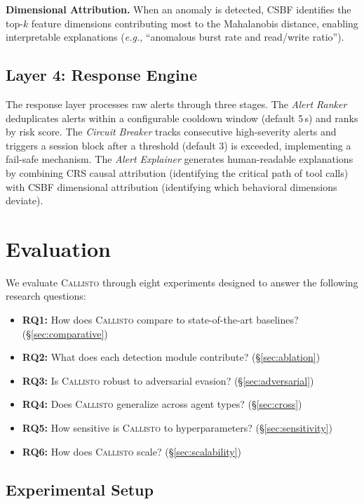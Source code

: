 \documentclass[conference,compsoc]{IEEEtran}
\newcommand{\system}{\textsc{Callisto}}
\newcommand{\eg}{\textit{e.g.}}
\begin{document}
\textbf{Dimensional Attribution.} When an anomaly is detected, CSBF identifies the top-$k$ feature dimensions contributing most to the Mahalanobis distance, enabling interpretable explanations (\eg, ``anomalous burst rate and read/write ratio'').

\subsection{Layer 4: Response Engine}

The response layer processes raw alerts through three stages. The \emph{Alert Ranker} deduplicates alerts within a configurable cooldown window (default 5\,s) and ranks by risk score. The \emph{Circuit Breaker} tracks consecutive high-severity alerts and triggers a session block after a threshold (default 3) is exceeded, implementing a fail-safe mechanism. The \emph{Alert Explainer} generates human-readable explanations by combining CRS causal attribution (identifying the critical path of tool calls) with CSBF dimensional attribution (identifying which behavioral dimensions deviate).

\section{Evaluation}
\label{sec:eval}

We evaluate \system{} through eight experiments designed to answer the following research questions:
\begin{itemize}[leftmargin=*,nosep]
\item \textbf{RQ1:} How does \system{} compare to state-of-the-art baselines? (\S\ref{sec:comparative})
\item \textbf{RQ2:} What does each detection module contribute? (\S\ref{sec:ablation})
\item \textbf{RQ3:} Is \system{} robust to adversarial evasion? (\S\ref{sec:adversarial})
\item \textbf{RQ4:} Does \system{} generalize across agent types? (\S\ref{sec:cross})
\item \textbf{RQ5:} How sensitive is \system{} to hyperparameters? (\S\ref{sec:sensitivity})
\item \textbf{RQ6:} How does \system{} scale? (\S\ref{sec:scalability})
\end{itemize}

\subsection{Experimental Setup}
\end{document}
